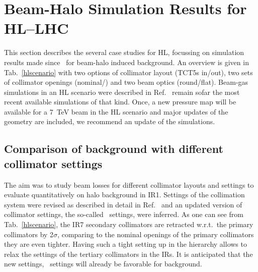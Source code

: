 \section{Beam-Halo Simulation Results for HL--LHC\label{hllhcResults}}


This section describes the several case studies for HL, focussing on simulation results made since~\cite{kweeIpac14} for beam-halo induced background. An overview is given in Tab.~\ref{hlscenario} with two options of collimator layout (TCT5s in/out), two sets of collimator openings (nominal/\twosigmaret) and two beam optics (round/flat). Beam-gas simulations in an HL scenario were described in Ref.~\cite{kweeIpac14} remain sofar the most recent available simulations of that kind. Once, a new pressure map will be available for a 7~TeV beam in the HL scenario and major updates of the geometry are included, we recommend an update of the simulations. 

\subsection{Comparison of background with different collimator settings}

The aim was to study beam losses for different collimator layouts and settings to evaluate quantitatively on halo background in IR1. Settings of the collimation system were revised as described in detail in Ref.~\cite{collSettRef} and an updated version of collimator settings, the so-called \twosigmaret~settings, were inferred. As one can see from Tab.~\ref{hlscenario}, the IR7 secondary collimators are retracted w.r.t.~the primary collimators by 2$\sigma$, comparing to the nominal openings of the primary collimators they are even tighter. Having such a tight setting up in the hierarchy allows to relax the settings of the tertiary collimators in the IRs. It is anticipated that the new settings, \twosigmaret~settings will already be favorable for background.

